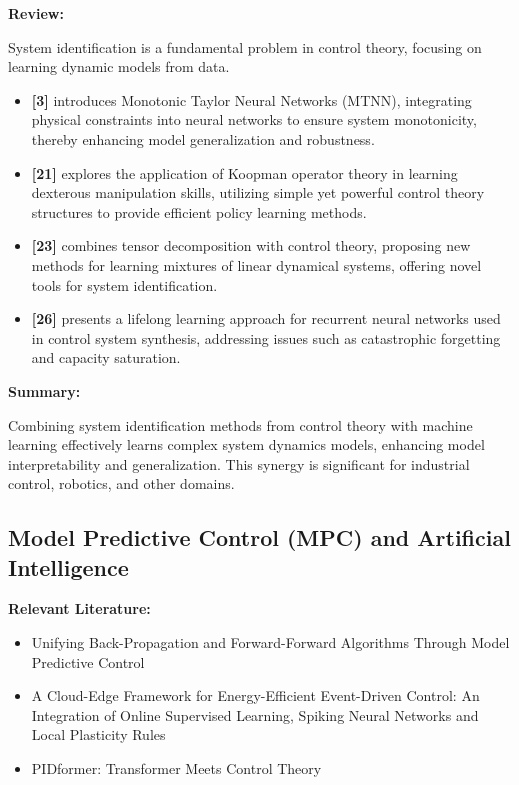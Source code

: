 \documentclass{article}
\theoremstyle{plain}
\theoremstyle{definition}
\theoremstyle{remark}
\begin{document}
\textbf{Review:}

System identification is a fundamental problem in control theory, focusing on learning dynamic models from data.

\begin{itemize}
    \item \textbf{[3]} introduces Monotonic Taylor Neural Networks (MTNN), integrating physical constraints into neural networks to ensure system monotonicity, thereby enhancing model generalization and robustness.
    
    \item \textbf{[21]} explores the application of Koopman operator theory in learning dexterous manipulation skills, utilizing simple yet powerful control theory structures to provide efficient policy learning methods.
    
    \item \textbf{[23]} combines tensor decomposition with control theory, proposing new methods for learning mixtures of linear dynamical systems, offering novel tools for system identification.
    
    \item \textbf{[26]} presents a lifelong learning approach for recurrent neural networks used in control system synthesis, addressing issues such as catastrophic forgetting and capacity saturation.
\end{itemize}

\textbf{Summary:}

Combining system identification methods from control theory with machine learning effectively learns complex system dynamics models, enhancing model interpretability and generalization. This synergy is significant for industrial control, robotics, and other domains.

\subsection{Model Predictive Control (MPC) and Artificial Intelligence}
\textbf{Relevant Literature:}
\begin{itemize}
    \item Unifying Back-Propagation and Forward-Forward Algorithms Through Model Predictive Control
    \item A Cloud-Edge Framework for Energy-Efficient Event-Driven Control: An Integration of Online Supervised Learning, Spiking Neural Networks and Local Plasticity Rules
    \item PIDformer: Transformer Meets Control Theory
\end{itemize}
\end{document}
